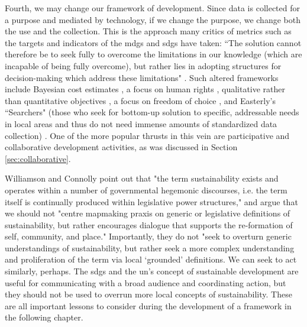 Fourth, we may change our framework of development. Since data is collected for a purpose and mediated by technology, if we change the purpose, we change both the use and the collection. This is the approach many critics of metrics such as the targets and indicators of the \acp{mdg} and \acp{sdg} have taken: ``The solution cannot therefore be to seek fully to overcome the limitations in our knowledge (which are incapable of being fully overcome), but rather lies in adopting structures for decision-making which address these limitations" \cite{reddyGlobalDevelopmentGoals2008}.	Such altered frameworks include Bayesian cost estimates \cite{reddyGlobalDevelopmentGoals2008}, a focus on human rights \cite{alstonShipsPassingNight2005}, qualitative rather than quantitative objectives \cite{fukuda-parrPowerNumbersCritical2014}, a focus on freedom of choice \cite{senFreedomChoiceConcept1988}, and Easterly's ``Searchers" (those who seek for bottom-up solution to specific, addressable needs in local areas and thus do not need immense amounts of standardized data collection) \cite{easterlyWhiteManBurden2007a}. One of the more popular thrusts in this vein are participative and collaborative development activities, as was discussed in Section \ref{sec:collaborative}.

Williamson and Connolly point out that "the term sustainability exists and operates within a number of governmental hegemonic discourses, i.e. the term itself is continually produced within legislative power structures," and argue that we should not "centre mapmaking praxis on generic or legislative definitions of sustainability, but rather encourages dialogue that supports the re-formation of self, community, and place." Importantly, they do not "seek to overturn generic understandings of sustainability, but rather seek a more complex understanding and proliferation of the term via local `grounded' definitions. \cite{williamsonTheirworkDevelopmentSustainable2011}
We can seek to act similarly, perhaps. The \acp{sdg} and the \ac{un}'s concept of sustainable development are useful for communicating with a broad audience and coordinating action, but they should not be used to overrun more local concepts of sustainability. These are all important lessons to consider during the development of a framework in the following chapter.


\subsection{} \label{sec:scenario_critique}

